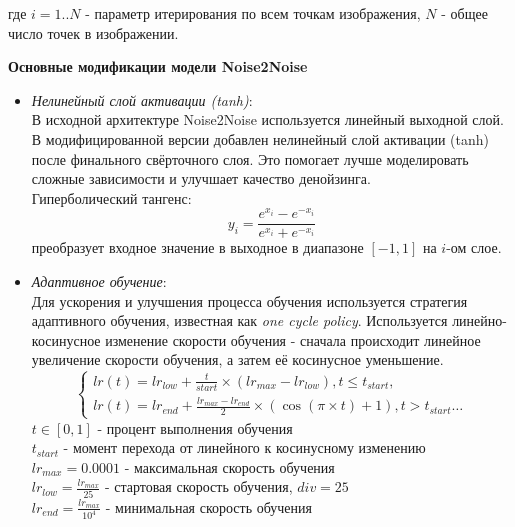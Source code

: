 где $i = 1..N$ - параметр итерирования по всем точкам изображения, $N$ - общее число точек в изображении.
\par \textbf{Основные модификации модели Noise2Noise}
\begin{itemize}[]
	\item \textit{Нелинейный слой активации (tanh)}:\\
	В исходной архитектуре Noise2Noise используется линейный выходной слой. В модифицированной версии добавлен нелинейный слой активации (tanh) после финального свёрточного слоя. Это помогает лучше моделировать сложные зависимости и улучшает качество денойзинга.\\
	Гиперболический тангенс:
	\begin{equation}
		y_i = \frac{e^{x_i} - e^{-x_i}}{e^{x_i} + e^{-x_i}}
	\end{equation}
	преобразует входное значение в выходное в диапазоне $[-1, 1]$ на $i$-ом слое.
	\item \textit{Адаптивное обучение}:\\ 
	Для ускорения и улучшения процесса обучения используется стратегия адаптивного обучения, известная как \textit{one cycle policy}. Используется линейно-косинусное изменение скорости обучения - сначала происходит линейное увеличение скорости обучения, а затем её косинусное уменьшение.
	\begin{equation}
		\left\{ \begin{aligned} 
			lr(t)= lr_{low} + \frac{t}{start} \times (lr_{max} - lr_{low}), t \leq t_{start},\\
			lr(t)= lr_{end} + \frac{lr_{max} - lr_{end}}{2} \times (\cos(\pi\times t) + 1), t > t_{start}\ldots
		\end{aligned} \right.
	\end{equation}
	$t \in [0, 1]$ - процент выполнения обучения\\
	$t_{start}$ - момент перехода от линейного к косинусному изменению\\
	$lr_{max} = 0.0001$ - максимальная скорость обучения\\
	$lr_{low} = \frac{lr_{max}}{25}$ - стартовая скорость обучения, $div = 25$\\
	$lr_{end} = \frac{lr_{max}}{10^4}$ - минимальная скорость обучения\\
\end{itemize}

